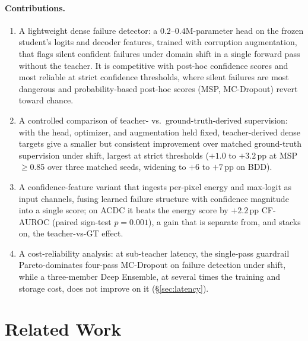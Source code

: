 \documentclass{article}
\begin{document}
\paragraph{Contributions.}
\begin{enumerate}
\item A lightweight dense failure detector: a $0.2$--$0.4$M-parameter head on the frozen student's logits and decoder features, trained with corruption augmentation, that flags silent confident failures under domain shift in a single forward pass without the teacher. It is competitive with post-hoc confidence scores and most reliable at strict confidence thresholds, where silent failures are most dangerous and probability-based post-hoc scores (MSP, MC-Dropout) revert toward chance.
\item A controlled comparison of teacher- vs.\ ground-truth-derived supervision: with the head, optimizer, and augmentation held fixed, teacher-derived dense targets give a smaller but consistent improvement over matched ground-truth supervision under shift, largest at strict thresholds ($+1.0$ to $+3.2$\,pp at MSP$\geq$0.85 over three matched seeds, widening to $+6$ to $+7$\,pp on BDD).
\item A confidence-feature variant that ingests per-pixel energy and max-logit as input channels, fusing learned failure structure with confidence magnitude into a single score; on ACDC it beats the energy score by $+2.2$\,pp CF-AUROC (paired sign-test $p{=}0.001$), a gain that is separate from, and stacks on, the teacher-vs-GT effect.
\item A cost-reliability analysis: at sub-teacher latency, the single-pass guardrail Pareto-dominates four-pass MC-Dropout on failure detection under shift, while a three-member Deep Ensemble, at several times the training and storage cost, does not improve on it (\S\ref{sec:latency}).
\end{enumerate}


\section{Related Work}
\end{document}
